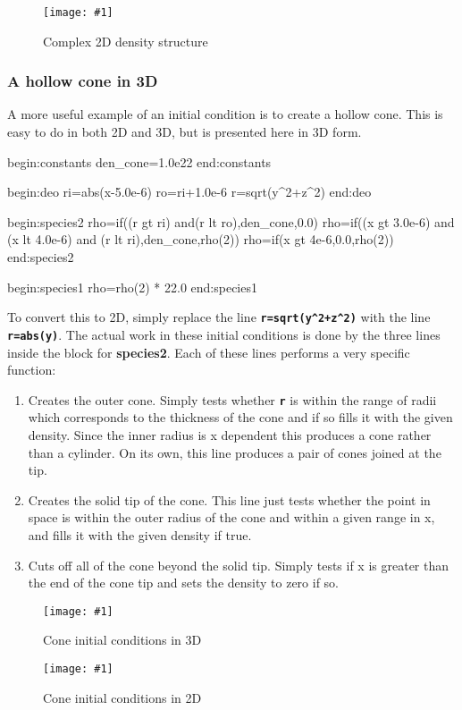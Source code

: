 \documentclass[12pt,a4paper]{article}
\newcommand{\inlinecode}[1]{{\color{warwickred} \bf\texttt{#1}}}
\newcommand{\inlineemph}[1]{{\color{warwicklight} \bf{#1}}}
\newcommand{\scaledcapimage}[4]
  {{\begin{figure}[hbt!]\centering\texttt{[image: \#1]}\caption{#3}
    \label{#2} \end{figure}}}
\newenvironment{lboxverbatim}[1]{
\setlength{\FrameSep}{0pt}
\def\FrameCommand{\fboxsep=0pt \colorbox{shadecolor}}
\MakeFramed{\FrameRestore}
\vspace{-13.5pt}
\fvset{label=#1}
\boxverb
}{
\endboxverb
\vspace{-13.5pt}
\endMakeFramed
}
\begin{document}
\scaledcapimage{./images/shapetest}{densitycomplex}{Complex 2D density
  structure}{0.4}

\subsubsection{A hollow cone in 3D}
A more useful example of an initial condition is to create a hollow cone. This
is easy to do in both 2D and 3D, but is presented here in 3D form.
\begin{lboxverbatim}{ic.deck}
begin:constants
   den_cone=1.0e22
end:constants

begin:deo
   ri=abs(x-5.0e-6)
   ro=ri+1.0e-6
   r=sqrt(y^2+z^2)
end:deo

begin:species2
   rho=if((r gt ri) and(r lt ro),den_cone,0.0)
   rho=if((x gt 3.0e-6) and (x lt 4.0e-6) and (r lt ri),den_cone,rho(2))
   rho=if(x gt 4e-6,0.0,rho(2))
end:species2

begin:species1
   rho=rho(2) * 22.0
end:species1
\end{lboxverbatim}

To convert this to 2D, simply replace the line
\inlinecode{r=sqrt(y\^{}2+z\^{}2)} with the line \inlinecode{r=abs(y)}. The
actual work in these initial conditions is done by the three lines inside the
block for \inlineemph{species2}. Each of these lines performs a very specific
function:

\begin{enumerate}
\item Creates the outer cone. Simply tests whether \inlinecode{r} is within
  the range of radii which corresponds to the thickness of the cone and if so
  fills it with the given density. Since the inner radius is x dependent this
  produces a cone rather than a cylinder. On its own, this line produces a
  pair of cones joined at the tip.
\item Creates the solid tip of the cone. This line just tests whether the
  point in space is within the outer radius of the cone and within a given
  range in x, and fills it with the given density if true.
\item Cuts off all of the cone beyond the solid tip. Simply tests if x is
  greater than the end of the cone tip and sets the density to zero if so.
\end{enumerate}

\scaledcapimage{./images/3dcone}{3dcone}{Cone initial conditions in 3D}{0.4}
\scaledcapimage{./images/2dcone}{2dcone}{Cone initial conditions in 2D}{0.4}
\end{document}
